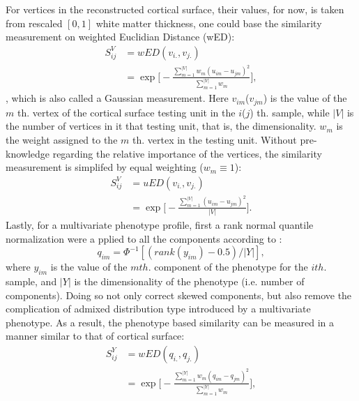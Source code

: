 For vertices in the reconstructed cortical surface, their values, for now, is taken from  rescaled $[0,1]$ white matter thickness, one could base the similarity measurement on weighted Euclidian Distance (wED):
\begin{equation} \label{eq:wSV}
\begin{split}
  S_{ij}^V &= wED(v_{i.},v_{j.}) \\
  &= \exp
  {
    \Big[-\frac{\sum_{m=1}^{|V|}{w_m(u_{im}-u_{jm})^2}} {\sum_{m=1}^{|V|}{w_m}}\Big]
  },
\end{split}
\end{equation}
, which is also called a Gaussian measurement. Here $v_{im}$($v_{jm}$) is the value of the $m$ th. vertex of the cortical surface testing unit in the $i$($j$) th. sample, while $|V|$ is the number of vertices in it that testing unit, that is, the dimensionality. $w_m$ is the weight assigned to the $m$ th. vertex in the testing unit. Without pre-knowledge regarding the relative importance of the vertices, the similarity measurement is simplifed by equal weighting ($w_m \equiv 1$):
\begin{equation*} \label{eq_uSV}
\begin{split}
  S_{ij}^V &= uED(v_{i.},v_{j.}) \\
  &= \exp
  {
    \Big[-\frac{\sum_{m=1}^{|V|}{(u_{im}-u_{jm})^2}} {|V|}\Big]
  }.
\end{split}
\end{equation*}
Lastly, for a multivariate phenotype profile, first a rank normal quantile normalization were a
pplied to all the components according to \cite{HWU}:
\begin{displaymath}
  q_{im}=\Phi^{-1}[(rank(y_{im})-0.5)/|Y|],
\end{displaymath} 
where $y_{im}$ is the value of the $m th.$ component of the phenotype for the $i th.$ sample, and $|Y|$ is the dimensionality of the phenotype (i.e. number of components). Doing so not only correct skewed components, but also remove the complication of admixed distribution type introduced by a multivariate phenotype. As a result, the phenotype based similarity can be measured in a manner similar to that of cortical surface:
\begin{equation} \label{eq_wSY}
\begin{split}
  S_{ij}^Y &= wED(q_{i.},q_{j.}) \\
  &=\exp
  {
    \Big[-\frac{\sum_{m=1}^{|Y|}{w_m(q_{im}-q_{jm})^2}} {\sum_{m=1}^{|Y|}{w_m}}\Big]
  },
\end{split}
\end{equation}
